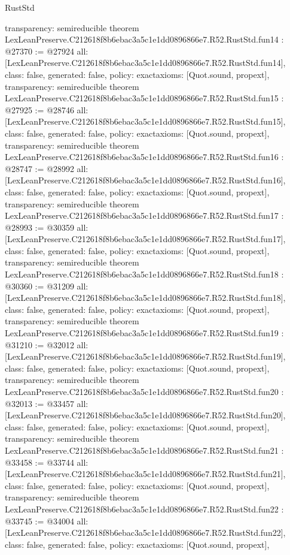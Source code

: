 \begin{lexlean}{RustStd}
\begin{coremodule}
{  transparency: semireducible
}
theorem LexLeanPreserve.C212618f8b6ebac3a5c1e1dd0896866e7.R52.RustStd.fun14 : @27370 := @27924 {
  all: [LexLeanPreserve.C212618f8b6ebac3a5c1e1dd0896866e7.R52.RustStd.fun14],
  class: false,
  generated: false,
  policy: exact{axioms: [Quot.sound, propext]},
  transparency: semireducible
}
theorem LexLeanPreserve.C212618f8b6ebac3a5c1e1dd0896866e7.R52.RustStd.fun15 : @27925 := @28746 {
  all: [LexLeanPreserve.C212618f8b6ebac3a5c1e1dd0896866e7.R52.RustStd.fun15],
  class: false,
  generated: false,
  policy: exact{axioms: [Quot.sound, propext]},
  transparency: semireducible
}
theorem LexLeanPreserve.C212618f8b6ebac3a5c1e1dd0896866e7.R52.RustStd.fun16 : @28747 := @28992 {
  all: [LexLeanPreserve.C212618f8b6ebac3a5c1e1dd0896866e7.R52.RustStd.fun16],
  class: false,
  generated: false,
  policy: exact{axioms: [Quot.sound, propext]},
  transparency: semireducible
}
theorem LexLeanPreserve.C212618f8b6ebac3a5c1e1dd0896866e7.R52.RustStd.fun17 : @28993 := @30359 {
  all: [LexLeanPreserve.C212618f8b6ebac3a5c1e1dd0896866e7.R52.RustStd.fun17],
  class: false,
  generated: false,
  policy: exact{axioms: [Quot.sound, propext]},
  transparency: semireducible
}
theorem LexLeanPreserve.C212618f8b6ebac3a5c1e1dd0896866e7.R52.RustStd.fun18 : @30360 := @31209 {
  all: [LexLeanPreserve.C212618f8b6ebac3a5c1e1dd0896866e7.R52.RustStd.fun18],
  class: false,
  generated: false,
  policy: exact{axioms: [Quot.sound, propext]},
  transparency: semireducible
}
theorem LexLeanPreserve.C212618f8b6ebac3a5c1e1dd0896866e7.R52.RustStd.fun19 : @31210 := @32012 {
  all: [LexLeanPreserve.C212618f8b6ebac3a5c1e1dd0896866e7.R52.RustStd.fun19],
  class: false,
  generated: false,
  policy: exact{axioms: [Quot.sound, propext]},
  transparency: semireducible
}
theorem LexLeanPreserve.C212618f8b6ebac3a5c1e1dd0896866e7.R52.RustStd.fun20 : @32013 := @33457 {
  all: [LexLeanPreserve.C212618f8b6ebac3a5c1e1dd0896866e7.R52.RustStd.fun20],
  class: false,
  generated: false,
  policy: exact{axioms: [Quot.sound, propext]},
  transparency: semireducible
}
theorem LexLeanPreserve.C212618f8b6ebac3a5c1e1dd0896866e7.R52.RustStd.fun21 : @33458 := @33744 {
  all: [LexLeanPreserve.C212618f8b6ebac3a5c1e1dd0896866e7.R52.RustStd.fun21],
  class: false,
  generated: false,
  policy: exact{axioms: [Quot.sound, propext]},
  transparency: semireducible
}
theorem LexLeanPreserve.C212618f8b6ebac3a5c1e1dd0896866e7.R52.RustStd.fun22 : @33745 := @34004 {
  all: [LexLeanPreserve.C212618f8b6ebac3a5c1e1dd0896866e7.R52.RustStd.fun22],
  class: false,
  generated: false,
  policy: exact{axioms: [Quot.sound, propext]},
}
\end{coremodule}
\end{lexlean}
